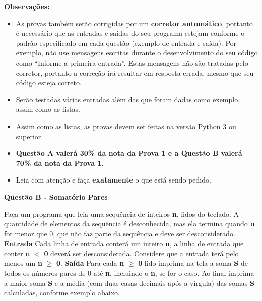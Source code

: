 \documentclass[a4paper, 12pt]{article}
\begin{document}
\textbf{{\large Observações:}}
\begin{itemize}
	\item As provas também serão corrigidas por um \textbf{corretor automático}, portanto é necessário que as entradas e saídas do seu programa estejam conforme o padrão especificado em cada questão (exemplo de entrada e saída). Por exemplo, não use mensagens escritas durante o desenvolvimento do seu código como “Informe a primeira entrada”. Estas mensagens não são tratadas pelo corretor, portanto a correção irá resultar em resposta errada, mesmo que seu código esteja correto.
	\item Serão testadas várias entradas além das que foram dadas como exemplo, assim como as listas.
	\item Assim como as listas, as provas devem ser feitas na versão Python 3 ou superior.
	\item \textbf{Questão A valerá 30\% da nota da Prova 1 e a Questão B valerá 70\% da nota da Prova 1}.
	\item Leia com atenção e faça \textbf{exatamente} o que está sendo pedido.
\end{itemize}
\newpage %
\begin{center}
\textbf{{\Large Questão B - Somatório Pares}}
\end{center}
\vspace{5pt}
Faça um programa que leia uma sequência de inteiros \textbf{n}, lidos do teclado. A quantidade de elementos da sequência é desconhecida, mas ela termina quando \textbf{n} for menor que 0, que não faz parte da sequência e deve ser desconsiderado.
\newline \newline
\textbf{{\large Entrada}} \newline
Cada linha de entrada conterá um inteiro \textbf{n}, a linha de entrada que conter \textbf{n} $<$ \textbf{0} deverá ser desconsiderada. Considere que a entrada terá pelo menos um \textbf{n} $\geq$ \textbf{0}.
\newline \newline
\textbf{{\large Saída}} \newline
Para cada \textbf{n} $\geq$ \textbf{0} lido imprima na tela a soma \textbf{S} de todos os números pares de 0 até \textbf{n}, incluindo o \textbf{n}, se for o caso. Ao final imprima a maior soma \textbf{S} e a média (com duas casas decimais após a vírgula) das somas \textbf{S} calculadas, conforme exemplo abaixo.
\newline
\end{document}
